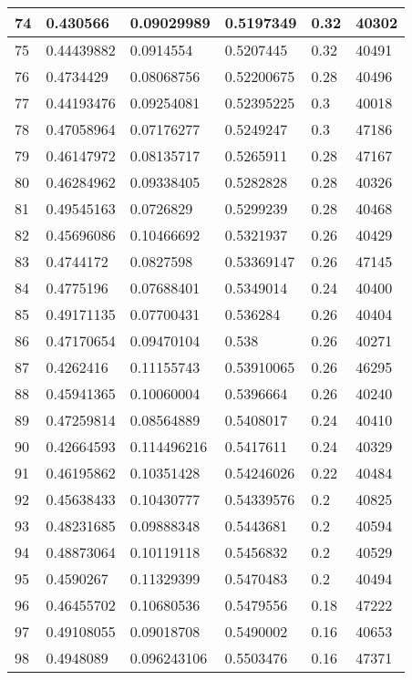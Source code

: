 \begin{longtable}{|l|l|l|l|l|l|}
74 & 0.430566 & 0.09029989 & 0.5197349 & 0.32 & 40302 \\ \hline 
75 & 0.44439882 & 0.0914554 & 0.5207445 & 0.32 & 40491 \\ \hline 
76 & 0.4734429 & 0.08068756 & 0.52200675 & 0.28 & 40496 \\ \hline 
77 & 0.44193476 & 0.09254081 & 0.52395225 & 0.3 & 40018 \\ \hline 
78 & 0.47058964 & 0.07176277 & 0.5249247 & 0.3 & 47186 \\ \hline 
79 & 0.46147972 & 0.08135717 & 0.5265911 & 0.28 & 47167 \\ \hline 
80 & 0.46284962 & 0.09338405 & 0.5282828 & 0.28 & 40326 \\ \hline 
81 & 0.49545163 & 0.0726829 & 0.5299239 & 0.28 & 40468 \\ \hline 
82 & 0.45696086 & 0.10466692 & 0.5321937 & 0.26 & 40429 \\ \hline 
83 & 0.4744172 & 0.0827598 & 0.53369147 & 0.26 & 47145 \\ \hline 
84 & 0.4775196 & 0.07688401 & 0.5349014 & 0.24 & 40400 \\ \hline 
85 & 0.49171135 & 0.07700431 & 0.536284 & 0.26 & 40404 \\ \hline 
86 & 0.47170654 & 0.09470104 & 0.538 & 0.26 & 40271 \\ \hline 
87 & 0.4262416 & 0.11155743 & 0.53910065 & 0.26 & 46295 \\ \hline 
88 & 0.45941365 & 0.10060004 & 0.5396664 & 0.26 & 40240 \\ \hline 
89 & 0.47259814 & 0.08564889 & 0.5408017 & 0.24 & 40410 \\ \hline 
90 & 0.42664593 & 0.114496216 & 0.5417611 & 0.24 & 40329 \\ \hline 
91 & 0.46195862 & 0.10351428 & 0.54246026 & 0.22 & 40484 \\ \hline 
92 & 0.45638433 & 0.10430777 & 0.54339576 & 0.2 & 40825 \\ \hline 
93 & 0.48231685 & 0.09888348 & 0.5443681 & 0.2 & 40594 \\ \hline 
94 & 0.48873064 & 0.10119118 & 0.5456832 & 0.2 & 40529 \\ \hline 
95 & 0.4590267 & 0.11329399 & 0.5470483 & 0.2 & 40494 \\ \hline 
96 & 0.46455702 & 0.10680536 & 0.5479556 & 0.18 & 47222 \\ \hline 
97 & 0.49108055 & 0.09018708 & 0.5490002 & 0.16 & 40653 \\ \hline 
98 & 0.4948089 & 0.096243106 & 0.5503476 & 0.16 & 47371 \\ \hline 

\end{longtable}
